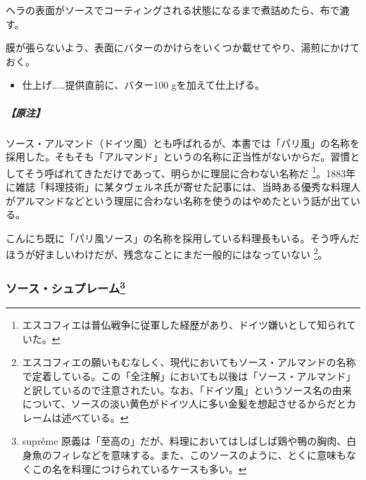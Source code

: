 \begin{recette}
ヘラの表面がソースでコーティングされる状態になるまで煮詰めたら、布で漉す。

膜が張らないよう、表面にバターのかけらをいくつか載せてやり、湯煎にかけておく。

\begin{itemize}
\tightlist
\item
  仕上げ\ldots{}\ldots{}提供直前に、バター100 gを加えて仕上げる。
\end{itemize}

\hypertarget{nota-sauce-allemande}{%
\subparagraph{【原注】}\label{nota-sauce-allemande}}

ソース・アルマンド（ドイツ風）とも呼ばれるが、本書では「パリ風」の名称を採用した。そもそも「アルマンド」というの名称に正当性がないからだ。習慣としてそう呼ばれてきただけであって、明らかに理屈に合わない名称だ
\footnote{エスコフィエは普仏戦争に従軍した経歴があり、ドイツ嫌いとして知られていた。}。1883年に雑誌「料理技術」に某タヴェルネ氏が寄せた記事には、当時ある優秀な料理人がアルマンドなどという理屈に合わない名称を使うのはやめたという話が出ている。

こんにち既に「パリ風ソース」の名称を採用している料理長もいる。そう呼んだほうが好ましいわけだが、残念なことにまだ一般的にはなっていない
\footnote{エスコフィエの願いもむなしく、現代においてもソース・アルマンドの名称で定着している。この「全注解」においても以後は「ソース・アルマンド」と訳しているので注意されたい。なお、「ドイツ風」というソース名の由来について、ソースの淡い黄色がドイツ人に多い金髪を想起させるからだとカレームは述べている。}。

\hypertarget{sauce-supreme}{%
\subsubsection[ソース・シュプレーム]{\texorpdfstring{ソース・シュプレーム\footnote{suprême
  原義は「至高の」だが、料理においてはしばしば鶏や鴨の胸肉、白身魚のフィレなどを意味する。また、このソースのように、とくに意味もなくこの名を料理につけられているケースも多い。}}{ソース・シュプレーム}}\label{sauce-supreme}}




\end{recette}
